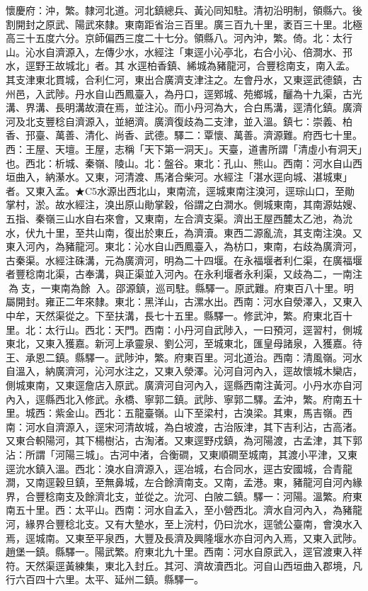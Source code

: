 \begin{pinyinscope}
懷慶府：沖，繁。隸河北道。河北鎮總兵、黃沁同知駐。清初沿明制，領縣六。後割開封之原武、陽武來隸。東南距省治三百里。廣三百九十里，袤百三十里。北極高三十五度六分。京師偏西三度二十七分。領縣八。河內沖，繁。倚。北：太行山。沁水自濟源入，左傳少水，水經注「東逕小沁亭北，右合小沁、倍澗水、邘水，逕野王故城北」者。其水逕柏香鎮、絺城為豬龍河，合豐稔南支，南入孟。其支津東北貫城，合利仁河，東出合廣濟支津注之。左會丹水，又東逕武德鎮，古州邑，入武陟。丹水自山西鳳臺入，為丹口，逕鄈城、苑鄉城，釃為十九渠，古光溝、界溝、長明溝故瀆在焉，並注沁。而小丹河為大，合白馬溝，逕清化鎮。廣濟河及北支豐稔自濟源入，並絕濟。廣濟復歧為二支津，並入溫。鎮七：崇義、柏香、邘臺、萬善、清化、尚香、武德。驛二：覃懷、萬善。濟源難。府西七十里。西：王屋、天壇。王屋，志稱「天下第一洞天」。天臺，道書所謂「清虛小有洞天」也。西北：析城、秦嶺、陵山。北：盤谷。東北：孔山、熊山。西南：河水自山西垣曲入，納濝水。又東，河清渡、馬渚合柴河。水經注「湛水逕向城、湛城東」者。又東入孟。★C5水源出西北山，東南流，逕城東南注溴河，逕琮山口，至勛掌村，淤。故水經注，溴出原山勛掌穀，俗謂之白澗水。側城東南，其南源姑嫂、五指、秦嶺三山水自右來會，又東南，左合濟支渠。濟出王屋西麓太乙池，為沇水，伏九十里，至共山南，復出於東丘，為濟瀆。東西二源亂流，其支南注溴。又東入河內，為豬龍河。東北：沁水自山西鳳臺入，為枋口，東南，右歧為廣濟河，古秦渠。水經注硃溝，元為廣濟河，明為二十四堰。在永福堰者利仁渠，在廣福堰者豐稔南北渠，古奉溝，與正渠並入河內。在永利堰者永利渠，又歧為二，一南注為支，一東南為餘，入。邵源鎮，巡司駐。縣驛一。原武難。府東百八十里。明屬開封。雍正二年來隸。東北：黑洋山，古漯水出。西南：河水自滎澤入，又東入中牟，天然渠從之。下至扶溝，長七十五里。縣驛一。修武沖，繁。府東北百十里。北：太行山。西北：天門。西南：小丹河自武陟入，一曰預河，逕習村，側城東北，又東入獲嘉。新河上承靈泉、劉公河，至城東北，匯皇母諸泉，入獲嘉。待王、承恩二鎮。縣驛一。武陟沖，繁。府東百里。河北道治。西南：清風嶺。河水自溫入，納廣濟河，沁河水注之，又東入滎澤。沁河自河內入，逕故懷城木欒店，側城東南，又東逕詹店入原武。廣濟河自河內入，逕縣西南注黃河。小丹水亦自河內入，逕縣西北入修武。永橋、寧郭二鎮。武陟、寧郭二驛。孟沖，繁。府南五十里。城西：紫金山。西北：五龍臺嶺。山下至梁村，古溴梁。其東，馬吉嶺。西南：河水自濟源入，逕宋河清故城，為白坡渡，古治阪津，其下吉利沾，古高渚。又東合軹陽河，其下楊樹沾，古淘渚。又東逕野戍鎮，為河陽渡，古孟津，其下郭沾：所謂「河陽三城」。古河中渚，合衡磵，又東順磵至城南，其渡小平津，又東逕沇水鎮入溫。西北：溴水自濟源入，逕冶城，右合同水，逕古安國城，合青龍澗，又南逕穀旦鎮，至無鼻城，左合餘濟南支。又南，孟港。東，豬龍河自河內緣界，合豐稔南支及餘濟北支，並從之。沇河、白陂二鎮。驛一：河陽。溫繁。府東南五十里。西：太平山。西南：河水自孟入，至小營西北。濟水自河內入，為豬龍河，緣界合豐稔北支。又有大墊水，至上浣村，仍曰沇水，逕虢公臺南，會溴水入焉，逕城南。又東至平泉西，大豐及長濟及興隆堰水亦自河內入焉，又東入武陟。趙堡一鎮。縣驛一。陽武繁。府東北九十里。西南：河水自原武入，逕官渡東入祥符。天然渠逕黃練集，東北入封丘。其河、濟故瀆西北。河自山西垣曲入郡境，凡行六百四十六里。太平、延州二鎮。縣驛一。


\end{pinyinscope}

